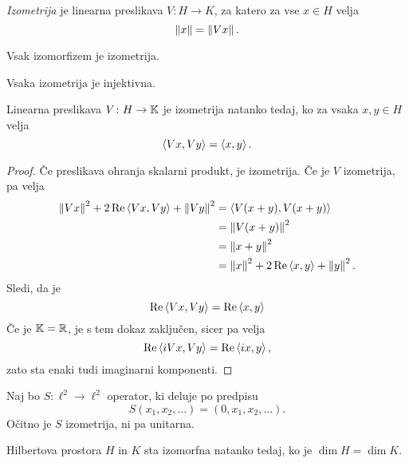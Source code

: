 \begin{definicija}
\emph{Izometrija} je linearna preslikava $V \colon H \to K$, za
katero za vse $x \in H$ velja
\[
\left\lVert x\right\rVert = \left\lVert Vx\right\rVert.
\]
\end{definicija}

\begin{opomba}
Vsak izomorfizem je izometrija.
\end{opomba}

\begin{opomba}
Vsaka izometrija je injektivna.
\end{opomba}


\begin{trditev}
Linearna preslikava $V \colon H \to \mathbb{K}$ je izometrija natanko
tedaj, ko za vsaka $x, y \in H$ velja
\[
\left\langle Vx,Vy\right\rangle = \left\langle x,y\right\rangle.
\]
\end{trditev}

\begin{proof}
Če preslikava ohranja skalarni produkt, je izometrija. Če je $V$
izometrija, pa velja
\begin{align*}
\left\lVert Vx\right\rVert^2 + 2 \operatorname{Re} \left\langle Vx, Vy\right\rangle + \left\lVert Vy\right\rVert^2 &=
\left\langle V(x+y),V(x+y)\right\rangle
\\
&=
\left\lVert V(x+y)\right\rVert^2
\\
&=
\left\lVert x+y\right\rVert^2
\\
&=
\left\lVert x\right\rVert^2 + 2 \operatorname{Re} \left\langle x,y\right\rangle + \left\lVert y\right\rVert^2.
\end{align*}
Sledi, da je
\[
\operatorname{Re} \left\langle Vx,Vy\right\rangle = \operatorname{Re} \left\langle x,y\right\rangle
\]
Če je $\mathbb{K} = \mathbb{R}$, je s tem dokaz zaključen, sicer pa velja
\[
\operatorname{Re} \left\langle iVx, Vy\right\rangle = \operatorname{Re} \left\langle ix,y\right\rangle,
\]
zato sta enaki tudi imaginarni komponenti.
\end{proof}

\begin{zgled}
Naj bo $S \colon \ell^2 \to \ell^2$ operator, ki deluje po predpisu
\[
S(x_1, x_2, \dots) = (0, x_1, x_2, \dots).
\]
Očitno je $S$ izometrija, ni pa unitarna.
\end{zgled}

\begin{izrek}
Hilbertova prostora $H$ in $K$ sta izomorfna natanko tedaj, ko je
$\dim H = \dim K$.
\end{izrek}

